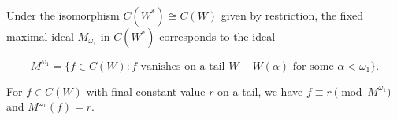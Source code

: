 Under the isomorphism $C(W^*) \cong C(W)$ given by restriction, the fixed maximal ideal $M_{\omega_1}$ in $C(W^*)$ corresponds to the ideal

$$M^{\omega_1} = \{f \in C(W) : f \text{ vanishes on a tail } W - W(\alpha) \text{ for some } \alpha < \omega_1\}.$$

For $f \in C(W)$ with final constant value $r$ on a tail, we have $f \equiv r \pmod{M^{\omega_1}}$ and $M^{\omega_1}(f) = r$.
